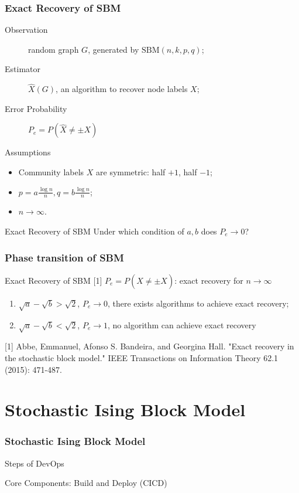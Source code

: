 \documentclass[notheorems]{beamer}
\begin{document}
\begin{frame}
\frametitle{Exact Recovery of SBM}
\begin{description}
	\item[Observation] random graph $G$, generated by $\textrm{SBM}(n,k,p,q)$;
	\item[Estimator] $\hat{X}(G)$, an algorithm to recover node labels $X$;
	\item[Error Probability] $P_e=P(\hat{X} \neq \pm X)$
\end{description}

\begin{block}{Assumptions}
	\begin{itemize}
	\item Community labels $X$ are symmetric: half $+1$, half $-1$;
	\item $p = a\frac{ \log n}{n}, q = b \frac{ \log n}{n}$;
	\item $n \to \infty$.
	\end{itemize}
\end{block}
\begin{block}{Exact Recovery of SBM}
Under which condition of $a,b$ does $P_e \to 0$?
\end{block}
\end{frame}
\begin{frame}
\frametitle{Phase transition of SBM}
\begin{block}{Exact Recovery of SBM [1]}
	$P_e=P(\hat{X} \neq \pm X)$: exact recovery for $n \to \infty$
	\begin{enumerate}
		\item $\sqrt{a} - \sqrt{b} > \sqrt{2}$, $P_e \to 0$, there exists algorithms to achieve exact recovery;
		\item $\sqrt{a} - \sqrt{b} < \sqrt{2}$, $P_e \to 1$, no algorithm can achieve exact recovery
	\end{enumerate}
\end{block}
{\scriptsize [1]
Abbe, Emmanuel, Afonso S. Bandeira, and Georgina Hall. "Exact recovery in the stochastic block model." IEEE Transactions on Information Theory 62.1 (2015): 471-487.
}
\end{frame}

\section{Stochastic Ising Block Model}
\frame{\tableofcontents[currentsection]}
\begin{frame}
\frametitle{Stochastic Ising Block Model}

Steps of DevOps
\begin{figure}
\end{figure}
Core Components: Build and Deploy (CICD)
\end{frame}
\end{document}
